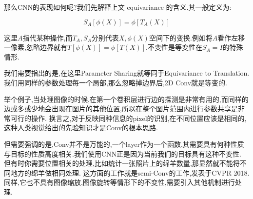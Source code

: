 那么CNN的表现如何呢?我们先解释上文 equivariance 的含义.其一般定义为:

\begin{equation}
	S_A[\phi(X)] = \phi[T_A(X)]
\end{equation}

这里$A$指代某种操作,而$T_A, S_A$分别代表$X,\phi(X)$空间下的变换.例如将$A$看作左移一像素,忽略边界就有$T[\phi(X)] = \phi[T(X)]$.不变性是等变性在$S_A = I$的特殊情形.

我们需要指出的是,在这里Parameter Sharing就等同于Equivariance to Translation.我们用同样的参数处理每一个局部,那么忽略掉边界后,2D Conv就是等变的.

举个例子,当处理图像的时候,在第一个卷积层进行边的探测是非常有用的,而同样的边或多或少地会出现在图片的其他位置,所以在整个图片范围内进行参数共享是非常可行的操作.
换言之,对于反映同种信息的pixel的识别,在不同位置应该是相同的,这种人类视觉给出的先验知识才是Conv的根本思路.

但需要强调的是,Conv并不是万能的,一个layer作为一个函数,其需要具有何种性质与目标的性质高度相关.我们使用CNN正是因为当前我们的目标具有这种不变性.
但有时你需要位置相关的处理,比如统计一张照片上的绵羊数量,那显然就不能将不同地方的绵羊做相同处理.
这方面的工作就是semi-Conv的工作,发表于CVPR 2018.同样,它也不具有图像缩放,图像旋转等情形下的不变性,需要引入其他机制进行处理.
